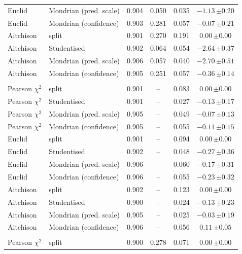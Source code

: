 \begin{tabular}{llcccc}
Euclid & Mondrian (pred. scale) & 0.904 & 0.050 & 0.035 & $-1.13\,{\scriptstyle\pm0.20}$\\
Euclid & Mondrian (confidence) & 0.903 & 0.281 & 0.057 & $-0.07\,{\scriptstyle\pm0.21}$\\
Aitchison & split & 0.901 & 0.270 & 0.191 & $0.00\,{\scriptstyle\pm0.00}$\\
Aitchison & Studentised & 0.902 & 0.064 & 0.054 & $-2.64\,{\scriptstyle\pm0.37}$\\
Aitchison & Mondrian (pred. scale) & 0.906 & 0.057 & 0.040 & $-2.70\,{\scriptstyle\pm0.51}$\\
Aitchison & Mondrian (confidence) & 0.905 & 0.251 & 0.057 & $-0.36\,{\scriptstyle\pm0.14}$\\
\addlinespace[2pt]
\multicolumn{6}{l}{\emph{Logistic-normal, homoscedastic}}\\
Pearson $\chi^2$ & split & 0.901 & -- & 0.083 & $0.00\,{\scriptstyle\pm0.00}$\\
Pearson $\chi^2$ & Studentised & 0.901 & -- & 0.027 & $-0.13\,{\scriptstyle\pm0.17}$\\
Pearson $\chi^2$ & Mondrian (pred. scale) & 0.905 & -- & 0.049 & $-0.07\,{\scriptstyle\pm0.13}$\\
Pearson $\chi^2$ & Mondrian (confidence) & 0.905 & -- & 0.055 & $-0.11\,{\scriptstyle\pm0.15}$\\
Euclid & split & 0.901 & -- & 0.094 & $0.00\,{\scriptstyle\pm0.00}$\\
Euclid & Studentised & 0.902 & -- & 0.048 & $-0.27\,{\scriptstyle\pm0.36}$\\
Euclid & Mondrian (pred. scale) & 0.906 & -- & 0.060 & $-0.17\,{\scriptstyle\pm0.31}$\\
Euclid & Mondrian (confidence) & 0.906 & -- & 0.055 & $-0.23\,{\scriptstyle\pm0.32}$\\
Aitchison & split & 0.902 & -- & 0.123 & $0.00\,{\scriptstyle\pm0.00}$\\
Aitchison & Studentised & 0.900 & -- & 0.024 & $-0.13\,{\scriptstyle\pm0.23}$\\
Aitchison & Mondrian (pred. scale) & 0.905 & -- & 0.025 & $-0.03\,{\scriptstyle\pm0.19}$\\
Aitchison & Mondrian (confidence) & 0.906 & -- & 0.056 & $0.11\,{\scriptstyle\pm0.05}$\\
\addlinespace[2pt]
\multicolumn{6}{l}{\emph{Logistic-normal, heteroscedastic}}\\
Pearson $\chi^2$ & split & 0.900 & 0.278 & 0.071 & $0.00\,{\scriptstyle\pm0.00}$\\

\end{tabular}

